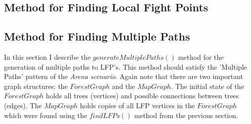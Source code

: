 

	




\subsection{Method for Finding Local Fight Points}


%

\subsection{Method for Finding Multiple Paths}

In this section I describe the $generateMultiplePaths()$ method for the generation of multiple paths to LFP's. This method should satisfy the 'Multiple Paths' pattern
of the \emph{Arena scenario}. Again note that there are two important graph structures: the $ForestGraph$ and the $MapGraph$. The initial state of the $ForestGraph$ holds all trees (vertices) and possible connections between trees (edges). The $MapGraph$ holds copies of all LFP vertices in the $ForestGraph$ which were found using the $findLFPs()$ method from the previous section. 

